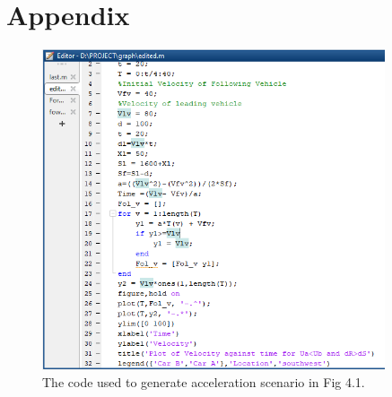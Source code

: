 \documentclass[12pt]{report}
\begin{document}




\appendix

\chapter{Appendix}

\begin{figure}[!ht]
	\includegraphics[width=0.9\textwidth]{accelerationcode.png}
	\caption{The code used to generate acceleration scenario in Fig 4.1.}
	\label{fig}
\end{figure}
\end{document}
